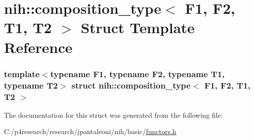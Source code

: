 \hypertarget{structnih_1_1composition__type}{
\section{nih\-:\-:composition\-\_\-type$<$ \-F1, \-F2, \-T1, \-T2 $>$ \-Struct \-Template \-Reference}
\label{structnih_1_1composition__type}
}
\subsubsection*{template$<$typename F1, typename F2, typename T1, typename T2$>$ struct nih\-::composition\-\_\-type$<$ F1, F2, T1, T2 $>$}



\-The documentation for this struct was generated from the following file\-:\begin{DoxyCompactItemize}
\item 
\-C\-:/p4research/research/jpantaleoni/nih/basic/\hyperlink{functors_8h}{functors.\-h}\end{DoxyCompactItemize}
